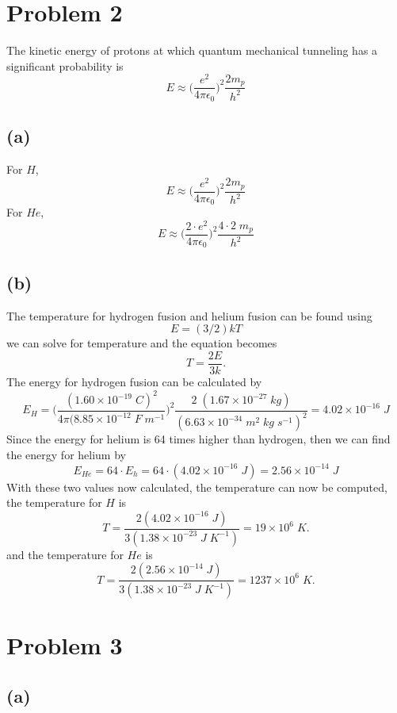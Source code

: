 \documentclass[11pt]{article}
\begin{document}
\clearpage

\section*{Problem 2}
The kinetic energy of protons at which quantum mechanical tunneling has a significant probability is
$$
E \approx \Bigg(\frac{e^{2}}{4 \pi \epsilon_{0}}\Bigg)^{2} \frac{2m_{p}}{h^{2}}
$$

\subsection*{(a)}

For $H$, 
$$
E \approx \Bigg(\frac{e^{2}}{4 \pi \epsilon_{0}}\Bigg)^{2} \frac{2m_{p}}{h^{2}} 
$$
For $He$, 
$$
E \approx \Bigg(\frac{2 \cdot e^{2}}{4 \pi \epsilon_{0}}\Bigg)^{2} \frac{4 \cdot 2 \; m_{p}}{h^{2}}
$$

\subsection*{(b)}

The temperature for hydrogen fusion and helium fusion can be found using 
$$
E = (3/2)kT
$$
we can solve for temperature and the equation becomes
$$
T = \frac{2E}{3k}.
$$
The energy for hydrogen fusion can be calculated by
$$
E_{H} = \Bigg(\frac{(1.60 \times 10^{-19} \; C)^{2}}{4 \pi (8.85 \times 10^{-12} \; F \; m^{-1}}\Bigg)^{2} \frac{2 \; (1.67 \times 10^{-27} \; kg)}{(6.63 \times 10^{-34} \; m^{2} \; kg \; s^{-1})^{2}} = 4.02 \times 10^{-16} \; J
$$
Since the energy for helium is 64 times higher than hydrogen, then we can find the energy for helium by
$$
E_{He} = 64 \cdot E_{h} = 64 \cdot (4.02 \times 10^{-16} \; J) = 2.56 \times 10^{-14} \; J
$$
With these two values now calculated, the temperature can now be computed, the temperature for $H$ is 
$$
T = \frac{2(4.02 \times 10^{-16} \; J)}{3(1.38 \times 10^{-23} \; J \; K^{-1})} = 19 \times 10^{6} \; K.
$$
and the temperature for $He$ is
$$
T = \frac{2( 2.56 \times 10^{-14} \; J)}{3(1.38 \times 10^{-23} \; J \; K^{-1})} = 1237 \times 10^{6} \; K.
$$

\clearpage

\section*{Problem 3}

\subsection*{(a)}
\end{document}
